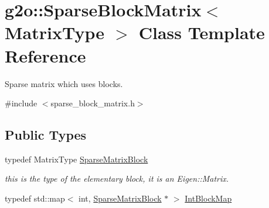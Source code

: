 \hypertarget{classg2o_1_1_sparse_block_matrix}{}\section{g2o\+:\+:Sparse\+Block\+Matrix$<$ Matrix\+Type $>$ Class Template Reference}
\label{classg2o_1_1_sparse_block_matrix}


Sparse matrix which uses blocks.  




{\ttfamily \#include $<$sparse\+\_\+block\+\_\+matrix.\+h$>$}

\subsection*{Public Types}
\begin{DoxyCompactItemize}
\item 
typedef Matrix\+Type \mbox{\hyperlink{classg2o_1_1_sparse_block_matrix_ab2f7376cbf055803fda6527dcc43e3be}{Sparse\+Matrix\+Block}}
\begin{DoxyCompactList}\small\item\em this is the type of the elementary block, it is an Eigen\+::\+Matrix. \end{DoxyCompactList}\item 
typedef std\+::map$<$ int, \mbox{\hyperlink{classg2o_1_1_sparse_block_matrix_ab2f7376cbf055803fda6527dcc43e3be}{Sparse\+Matrix\+Block}} $\ast$ $>$ \mbox{\hyperlink{classg2o_1_1_sparse_block_matrix_aaa6ca1ae454ed70f62992b6401645f4e}{Int\+Block\+Map}}
\end{DoxyCompactItemize}
